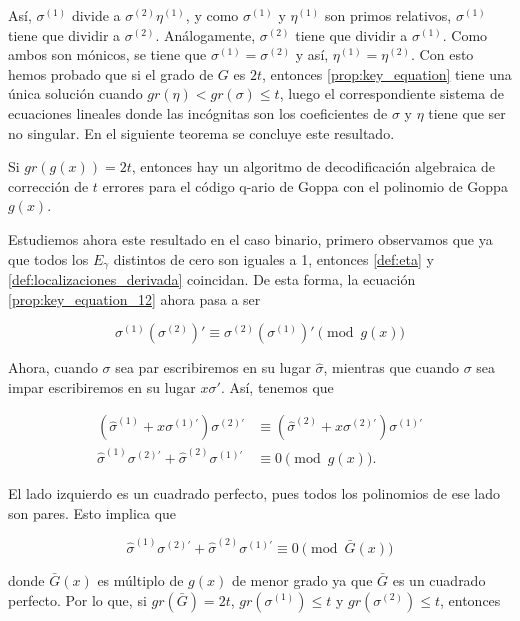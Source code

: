 Así, $\sigma^{(1)}$ divide a $\sigma^{(2)} \eta^{(1)}$, y como $\sigma^{(1)}$ y $\eta^{(1)}$ son primos relativos, $\sigma^{(1)}$ tiene que dividir a $\sigma^{(2)}$. Análogamente, $\sigma^{(2)}$ tiene que dividir a $\sigma^{(1)}$. Como ambos son mónicos, se tiene que $\sigma^{(1)} = \sigma^{(2)}$ y así, $\eta^{(1)} = \eta^{(2)}$. Con esto hemos probado que si el grado de $G$ es $2t$, entonces \ref{prop:key_equation} tiene una única solución cuando $gr(\eta) < gr(\sigma) \leq t$, luego el correspondiente sistema de ecuaciones lineales donde las incógnitas son los coeficientes de $\sigma$ y $\eta$ tiene que ser no singular. En el siguiente teorema se concluye este resultado.

\begin{theorem}
    Si $gr(g(x)) = 2t$, entonces hay un algoritmo de decodificación algebraica de corrección de $t$ errores para el código q-ario de Goppa con el polinomio de Goppa $g(x)$.
\end{theorem}

Estudiemos ahora este resultado en el caso binario, primero observamos que ya que todos los $E_\gamma$ distintos de cero son iguales a 1, entonces \ref{def:eta} y \ref{def:localizaciones_derivada} coincidan. De esta forma, la ecuación \ref{prop:key_equation_12} ahora pasa a ser

$$\sigma^{(1)} \left( \sigma^{(2)} \right) ' \equiv \sigma^{(2)} \left( \sigma^{(1)} \right) ' \pmod{g(x)}$$

Ahora, cuando $\sigma$ sea par escribiremos en su lugar $\hat{\sigma}$, mientras que cuando $\sigma$ sea impar escribiremos en su lugar $x \sigma '$. Así, tenemos que

\begin{align*} 
    \left( \hat{\sigma}^{(1)} + x \sigma^{(1)'} \right) \sigma^{(2)'} &\equiv \left( \hat{\sigma}^{(2)} + x \sigma^{(2)'} \right) \sigma^{(1)'}\\ 
    \hat{\sigma}^{(1)} \sigma^{(2)'} + \hat{\sigma}^{(2)} \sigma^{(1)'} &\equiv 0 \pmod{g(x)}.
\end{align*}

El lado izquierdo es un cuadrado perfecto, pues todos los polinomios de ese lado son pares. Esto implica que

$$\hat{\sigma}^{(1)} \sigma^{(2)'} + \hat{\sigma}^{(2)} \sigma^{(1)'} \equiv 0 \pmod{\bar{G}(x)}$$

donde $\bar{G}(x)$ es múltiplo de $g(x)$ de menor grado ya que $\bar{G}$ es un cuadrado perfecto. Por lo que, si $gr(\bar{G}) = 2t$, $gr(\sigma^{(1)}) \leq t$ y $gr(\sigma^{(2)}) \leq t$, entonces 

